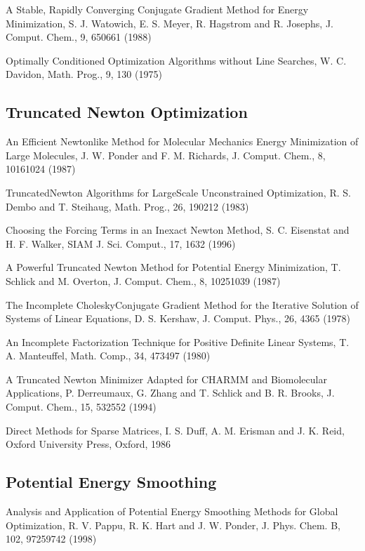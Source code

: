 \documentclass[letterpaper,11pt,english]{sphinxmanual}
\begin{document}
\sphinxAtStartPar
A Stable, Rapidly Converging Conjugate Gradient Method for Energy Minimization, S. J. Watowich, E. S. Meyer, R. Hagstrom and R. Josephs, J. Comput. Chem., 9, 650\sphinxhyphen{}661 (1988)

\sphinxAtStartPar
Optimally Conditioned Optimization Algorithms without Line Searches, W. C. Davidon, Math. Prog., 9, 1\sphinxhyphen{}30 (1975)


\subsection{Truncated Newton Optimization}
\label{\detokenize{text/references:truncated-newton-optimization}}
\sphinxAtStartPar
An Efficient Newton\sphinxhyphen{}like Method for Molecular Mechanics Energy Minimization of Large Molecules, J. W. Ponder and F. M. Richards, J. Comput. Chem., 8, 1016\sphinxhyphen{}1024 (1987)

\sphinxAtStartPar
Truncated\sphinxhyphen{}Newton Algorithms for Large\sphinxhyphen{}Scale Unconstrained Optimization, R. S. Dembo and T. Steihaug, Math. Prog., 26, 190\sphinxhyphen{}212 (1983)

\sphinxAtStartPar
Choosing the Forcing Terms in an Inexact Newton Method, S. C. Eisenstat and H. F. Walker, SIAM J. Sci. Comput., 17, 16\sphinxhyphen{}32 (1996)

\sphinxAtStartPar
A Powerful Truncated Newton Method for Potential Energy Minimization, T. Schlick and M. Overton, J. Comput. Chem., 8, 1025\sphinxhyphen{}1039 (1987)

\sphinxAtStartPar
The Incomplete Cholesky\sphinxhyphen{}Conjugate Gradient Method for the Iterative Solution of Systems of Linear Equations, D. S. Kershaw, J. Comput. Phys., 26, 43\sphinxhyphen{}65 (1978)

\sphinxAtStartPar
An Incomplete Factorization Technique for Positive Definite Linear Systems, T. A. Manteuffel, Math. Comp., 34, 473\sphinxhyphen{}497 (1980)

\sphinxAtStartPar
A Truncated Newton Minimizer Adapted for CHARMM and Biomolecular Applications, P. Derreumaux, G. Zhang and T. Schlick and B. R. Brooks, J. Comput. Chem., 15, 532\sphinxhyphen{}552 (1994)

\sphinxAtStartPar
Direct Methods for Sparse Matrices, I. S. Duff, A. M. Erisman and J. K. Reid, Oxford University Press, Oxford, 1986


\subsection{Potential Energy Smoothing}
\label{\detokenize{text/references:potential-energy-smoothing}}
\sphinxAtStartPar
Analysis and Application of Potential Energy Smoothing Methods for Global Optimization, R. V. Pappu, R. K. Hart and J. W. Ponder, J. Phys. Chem. B, 102, 9725\sphinxhyphen{}9742 (1998)
\end{document}
